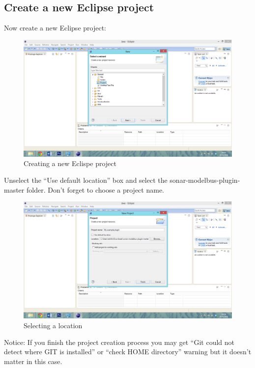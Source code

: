 \subsection{Create a new Eclipse project}
Now create a new Eclipse project:

\begin{figure}
	\centering
		\includegraphics[width=\textwidth]{neweclipseproject}
	\caption{Creating a new Eclispe project}
	\label{fig:neweclipseproject}
\end{figure}

Unselect the "`Use default location"' box and select the sonar-modelbus-plugin-master folder. Don't forget to choose a project name.
 
\begin{figure}
	\centering
		\includegraphics[width=\textwidth]{selectlocation}
	\caption{Selecting a location}
	\label{fig:selectlocation}
\end{figure}

Notice: If you finish the project creation process you may get
"`Git could not detect where GIT is installed"' or "`check HOME directory"' warning but it doesn't matter in this case.
